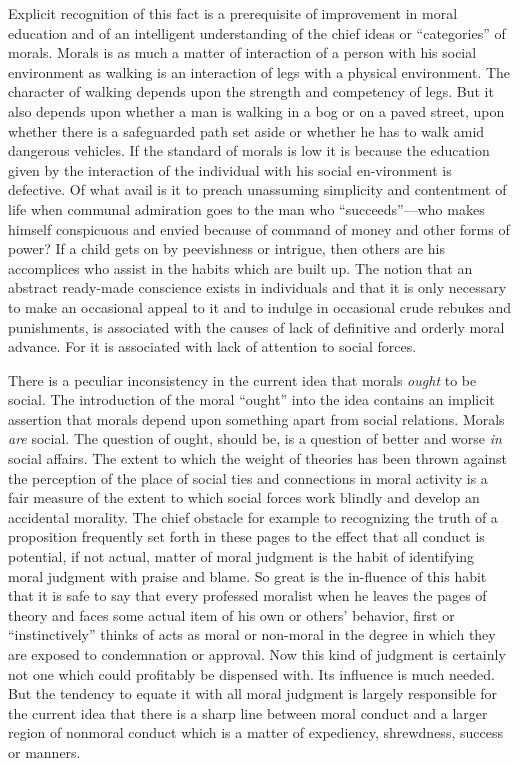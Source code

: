 Explicit recognition of this fact is a prerequisite of improvement in
moral education and of an intelligent understanding of the chief ideas
or ``categories'' of morals. Morals is as much a matter of interaction
of a person with his social environment as walking is an interaction
of legs with a physical environment. The character of walking depends
upon the strength and competency of legs. But it also depends upon
whether a man is walking in a bog or on a paved street, upon whether
there is a safeguarded path set aside or whether he has to walk amid
dangerous vehicles. If the standard of morals is low it is because the
education given by the interaction of the individual with his social
en-vironment is defective. Of what avail is it to preach
unassuming simplicity and contentment of life when communal admiration
goes to the man who ``suc\-ceeds''---who makes himself conspicuous and
envied because of command of money and other forms of power? If a
child gets on by peevishness or intrigue, then others are his
accomplices who assist in the habits which are built up. The notion
that an abstract ready-made conscience exists in individuals and that
it is only necessary to make an occasional appeal to it and to indulge
in occasional crude rebukes and punishments, is associated with the
causes of lack of definitive and orderly moral advance. For it is
associated with lack of attention to social forces.

There is a peculiar inconsistency in the current idea that morals
\textit{ought} to be social. The introduction of the moral ``ought''
into the idea contains an implicit assertion that morals depend upon
something apart from social relations. Morals \textit{are} social. The
question of ought, should be, is a question of better and worse
\textit{in} social affairs. The extent to which the weight of theories
has been thrown against the perception of the place of social ties and
connections in moral activity is a fair measure of the extent to which
social forces work blindly and develop an accidental morality. The
chief obstacle for example to recognizing the truth of a proposition
frequently set forth in these pages to the effect that all conduct is
potential, if not actual, matter of moral judgment is the habit of
identifying moral judgment with praise and blame. So great is the
in-fluence of this habit that it is safe to say that every
professed moralist when he leaves the pages of theory and faces some
actual item of his own or others' behavior, first or ``instinctively''
thinks of acts as moral or non-moral in the degree in which they are
exposed to condemnation or approval. Now this kind of judgment is
certainly not one which could profitably be dispensed with. Its
influence is much needed. But the tendency to equate it with all moral
judgment is largely responsible for the current idea that there is a
sharp line between moral conduct and a larger region of nonmoral
conduct which is a matter of expediency, shrewdness, success or
manners.

